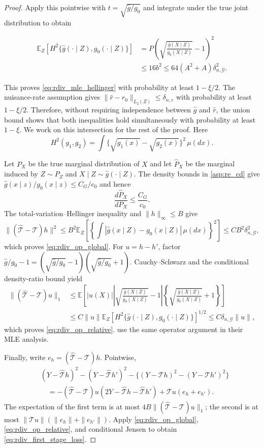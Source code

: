 \begin{proof}
Apply this pointwise with $t=\sqrt{\hat g/g_0}$ and integrate under the true joint distribution to obtain

\[
\begin{aligned}
\mathbb E_Z\!\left[H^2\{\hat g(\cdot\mid Z),g_0(\cdot\mid Z)\}\right]
&=P\left(\sqrt{\frac{\hat g(X\mid Z)}{g_0(X\mid Z)}}-1\right)^2\\
&\leqslant16b^2
\leqslant64(A^2+A)\delta_{n,\mathcal G}^2.
\end{aligned}
\]

This proves \eqref{eq:rdiv_mle_hellinger} with probability at least $1-\xi/2$. The
nuisance-rate assumption gives
$\|\hat r-r_0\|_{L_2(Z)}\leqslant\delta_{n,r}$ with probability at least
$1-\xi/2$. Therefore, without requiring independence between $\hat g$ and
$\hat r$, the union bound shows that both inequalities hold simultaneously
with probability at least $1-\xi$. We work on this intersection for
the rest of the proof. Here
\[
H^2(g_1,g_2)=\int\{\sqrt{g_1(x)}-\sqrt{g_2(x)}\}^2\,\mu(dx).
\]

Let $P_X$ be the true marginal distribution of $X$ and let $\hat P_X$ be the marginal induced by $Z\sim P_Z$ and $X\mid Z\sim\hat g(\cdot\mid Z)$. The density bounds in \cref{asp:re_cd} give $\hat g(x\mid z)/g_0(x\mid z)\leqslant C_G/c_0$ and hence
\[
\frac{d\hat P_X}{dP_X}\leqslant \frac{C_G}{c_0}.
\]
The total-variation--Hellinger inequality and $\|h\|_\infty\leqslant B$ give
\[
\|(\hat{\mathcal T}-\mathcal T)h\|^2
\leqslant B^2\mathbb E_Z
\left[\left\{\int|\hat g(x\mid Z)-g_0(x\mid Z)|\,\mu(dx)\right\}^2\right]
\leqslant C B^2\delta_{n,\mathcal G}^2,
\]
which proves \eqref{eq:rdiv_op_global}. For $u=h-h'$, factor
$\hat g/g_0-1=(\sqrt{\hat g/g_0}-1)(\sqrt{\hat g/g_0}+1)$.
Cauchy--Schwarz and the conditional density-ratio bound yield
\begin{align*}
\|(\hat{\mathcal T}-\mathcal T)u\|_1
&\leqslant
\mathbb E\left[|u(X)|
\left|\sqrt{\frac{\hat g(X\mid Z)}{g_0(X\mid Z)}}-1\right|
\left\{\sqrt{\frac{\hat g(X\mid Z)}{g_0(X\mid Z)}}+1\right\}\right]\\
&\leqslant C\|u\|
\mathbb E_Z\!\left[H^2\{\hat g(\cdot\mid Z),g_0(\cdot\mid Z)\}\right]^{1/2}
\leqslant C\delta_{n,\mathcal G}\|u\|,
\end{align*}
which proves \eqref{eq:rdiv_op_relative}. \citet{li2024regularized} use the same operator argument in their MLE analysis.

Finally, write $e_h=(\hat{\mathcal T}-\mathcal T)h$. Pointwise,
\begin{align*}
&(Y-\hat{\mathcal T}h)^2-(Y-\hat{\mathcal T}h')^2
-\{(Y-\mathcal T h)^2-(Y-\mathcal T h')^2\}\\
&\quad=-(\hat{\mathcal T}-\mathcal T)u
(2Y-\hat{\mathcal T}h-\hat{\mathcal T}h')
+\mathcal T u(e_h+e_{h'}).
\end{align*}
The expectation of the first term is at most
$4B\|(\hat{\mathcal T}-\mathcal T)u\|_1$; the second is at most
$\|\mathcal T u\|(\|e_h\|+\|e_{h'}\|)$. Apply
\eqref{eq:rdiv_op_global}, \eqref{eq:rdiv_op_relative}, and conditional Jensen to obtain \eqref{eq:rdiv_first_stage_loss}.
\end{proof}

